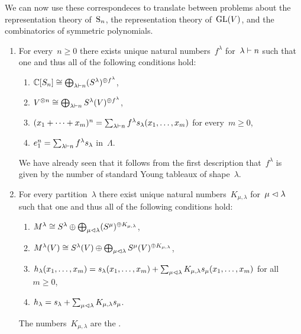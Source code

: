 \documentclass[a4paper,10pt]{scrartcl}
\begin{document}
We can now use these correspondeces to translate between problems about the representation theory of~$\operatorname{S}_n$, the representation theory of~$\operatorname{GL}(V)$, and the combinatorics of symmetric polynomials.

\begin{example}
  \leavevmode
  \begin{enumerate}
    \item
      For every~$n \geq 0$ there exists unique natural numbers~$f^\lambda$ for~$\lambda \vdash n$ such that one and thus all of the following conditions hold:
      \begin{enumerate}
        \item
          $\mathbb{C}[S_n] \cong \bigoplus_{\lambda \vdash n} (S^\lambda)^{\oplus f^\lambda}$,
        \item
          $V^{\otimes n} \cong \bigoplus_{\lambda \vdash n} S^\lambda(V)^{\oplus f^\lambda}$,
        \item
          $(x_1 + \dotsb + x_m)^n = \sum_{\lambda \vdash n} f^\lambda s_\lambda(x_1, \dotsc, x_m)$ for every~$m \geq 0$,
        \item
          $e_1^n = \sum_{\lambda \vdash n} f^\lambda s_\lambda$ in~$\Lambda$.
      \end{enumerate}
      We have already seen that it follows from the first description that~$f^\lambda$ is given by the number of standard Young tableaux of shape~$\lambda$.
    \item
      For every partition~$\lambda$ there exist unique natural numbers~$K_{\mu, \lambda}$ for~$\mu \vartriangleleft \lambda$ such that one and thus all of the following conditions hold:
      \begin{enumerate}
        \item
          $M^\lambda \cong S^\lambda \oplus \bigoplus_{\mu \vartriangleleft \lambda} (S^\mu)^{\oplus K_{\mu, \lambda}}$,
        \item
          $M^\lambda(V) \cong S^\lambda(V) \oplus \bigoplus_{\mu \vartriangleleft \lambda} S^\mu(V)^{\oplus K_{\mu, \lambda}}$,
        \item
          $h_\lambda(x_1, \dotsc, x_m) = s_\lambda(x_1, \dotsc, x_m) + \sum_{\mu \vartriangleleft \lambda} K_{\mu, \lambda} s_\mu(x_1, \dotsc, x_m)$ for all~$m \geq 0$,
        \item
          $h_\lambda = s_\lambda + \sum_{\mu \vartriangleleft \lambda} K_{\mu, \lambda} s_\mu$.
      \end{enumerate}
      The numbers~$K_{\mu, \lambda}$ are the .

\end{enumerate}
\end{example}
\end{document}
